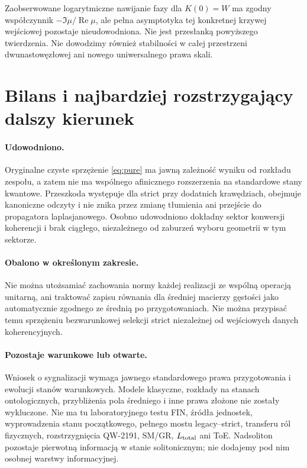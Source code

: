 \documentclass[11pt,a4paper]{article}
\newcommand{\Rea}{\operatorname{Re}}
\begin{document}
Zaobserwowane logarytmiczne nawijanie fazy dla $K(0)=W$ ma zgodny
współczynnik $-\Im\mu/\Rea\mu$, ale pełna asymptotyka tej konkretnej
krzywej wejściowej pozostaje nieudowodniona. Nie jest przesłanką
powyższego twierdzenia. Nie dowodzimy również stabilności w całej
przestrzeni dwunastowęzłowej ani nowego uniwersalnego prawa skali.

\section{Bilans i najbardziej rozstrzygający dalszy kierunek}

\paragraph{Udowodniono.}
Oryginalne czyste sprzężenie \eqref{eq:pure} ma jawną zależność wyniku
od rozkładu zespołu, a zatem nie ma wspólnego afinicznego rozszerzenia
na standardowe stany kwantowe. Przeszkoda występuje dla strict przy
dodatnich krawędziach, obejmuje kanoniczne odczyty i nie znika przez
zmianę tłumienia ani przejście do propagatora laplasjanowego.
Osobno udowodniono dokładny sektor konwersji koherencji i brak
ciągłego, niezależnego od zaburzeń wyboru geometrii w tym sektorze.

\paragraph{Obalono w określonym zakresie.}
Nie można utożsamiać zachowania normy każdej realizacji ze wspólną
operacją unitarną, ani traktować zapisu równania dla średniej macierzy
gęstości jako automatycznie zgodnego ze średnią po przygotowaniach.
Nie można przypisać temu sprzężeniu bezwarunkowej selekcji strict
niezależnej od wejściowych danych koherencyjnych.

\paragraph{Pozostaje warunkowe lub otwarte.}
Wniosek o sygnalizacji wymaga jawnego standardowego prawa przygotowania
i ewolucji stanów warunkowych. Modele klasyczne, rozkłady na stanach
ontologicznych, przybliżenia pola średniego i inne prawa złożone nie
zostały wykluczone. Nie ma tu laboratoryjnego testu FIN, źródła jednostek,
wyprowadzenia stanu początkowego, pełnego mostu legacy--strict, transferu
ról fizycznych, rozstrzygnięcia QW-2191, SM/GR, $L_{\rm total}$ ani ToE.
Nadsoliton pozostaje pierwotną informacją w stanie solitonicznym;
nie dodajemy pod nim osobnej warstwy informacyjnej.
\end{document}
